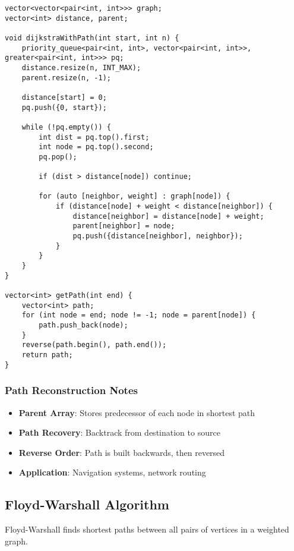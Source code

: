 \documentclass[11pt,a4paper]{article}
\begin{document}
\newpage
\begin{lstlisting}[caption={Dijkstra with Path Reconstruction}]
vector<vector<pair<int, int>>> graph;
vector<int> distance, parent;

void dijkstraWithPath(int start, int n) {
    priority_queue<pair<int, int>, vector<pair<int, int>>, greater<pair<int, int>>> pq;
    distance.resize(n, INT_MAX);
    parent.resize(n, -1);
    
    distance[start] = 0;
    pq.push({0, start});
    
    while (!pq.empty()) {
        int dist = pq.top().first;
        int node = pq.top().second;
        pq.pop();
        
        if (dist > distance[node]) continue;
        
        for (auto [neighbor, weight] : graph[node]) {
            if (distance[node] + weight < distance[neighbor]) {
                distance[neighbor] = distance[node] + weight;
                parent[neighbor] = node;
                pq.push({distance[neighbor], neighbor});
            }
        }
    }
}

vector<int> getPath(int end) {
    vector<int> path;
    for (int node = end; node != -1; node = parent[node]) {
        path.push_back(node);
    }
    reverse(path.begin(), path.end());
    return path;
}
\end{lstlisting}

\subsubsection*{Path Reconstruction Notes}
\begin{itemize}
\item \textbf{Parent Array}: Stores predecessor of each node in shortest path
\item \textbf{Path Recovery}: Backtrack from destination to source
\item \textbf{Reverse Order}: Path is built backwards, then reversed
\item \textbf{Application}: Navigation systems, network routing
\end{itemize}

\newpage

\subsection{Floyd-Warshall Algorithm}
Floyd-Warshall finds shortest paths between all pairs of vertices in a weighted graph.
\end{document}
